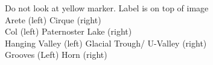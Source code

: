  Do not look at yellow marker. Label is on top of image\\
Arete (left) Cirque (right) \\
Col (left) Paternoster Lake (right)\\
Hanging Valley (left) Glacial Trough/ U-Valley (right)\\
Grooves (Left) Horn (right) \\
